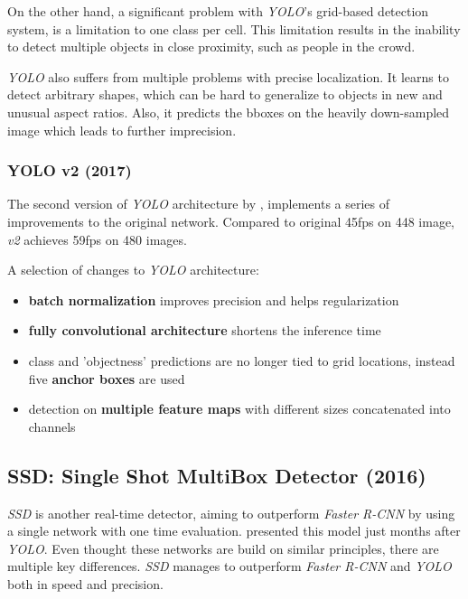 On the other hand, a significant problem with \textit{YOLO}'s grid-based detection system, is a limitation to one class per cell. This limitation results in the inability to detect multiple objects in close proximity, such as people in the crowd. 

\textit{YOLO} also suffers from multiple problems with precise localization. It learns to detect arbitrary shapes, which can be hard to generalize to objects in new and unusual aspect ratios. Also, it predicts the bboxes on the heavily down-sampled image which leads to further imprecision. 

\subsubsection{YOLO v2 (2017)}
The second version of \textit{YOLO} architecture by \citeauthor{bib:yolo9000} \cite{bib:yolo9000}, implements a series of improvements to the original network. Compared to original 45fps on 448 image, \textit{v2} achieves 59fps on 480 images. 

A selection of changes to \textit{YOLO} architecture:
\begin{itemize}
    \item \textbf{batch normalization} improves precision and helps regularization
    \item \textbf{fully convolutional architecture} shortens the inference time
    \item class and 'objectness' predictions are no longer tied to grid locations, instead five \textbf{anchor boxes} are used
    \item detection on \textbf{multiple feature maps} with different sizes concatenated into channels
    
\end{itemize}


\subsection{SSD: Single Shot MultiBox Detector (2016)}
\label{sec:ssd}
\textit{SSD} is another real-time detector, aiming to outperform \textit{Faster R-CNN} by using a single network with one time evaluation. \citeauthor{bib:ssd} \cite{bib:ssd} presented this model just months after \textit{YOLO}. Even thought these networks are build on similar principles, there are multiple key differences. \textit{SSD} manages to outperform \textit{Faster R-CNN} and \textit{YOLO} both in speed and precision.

